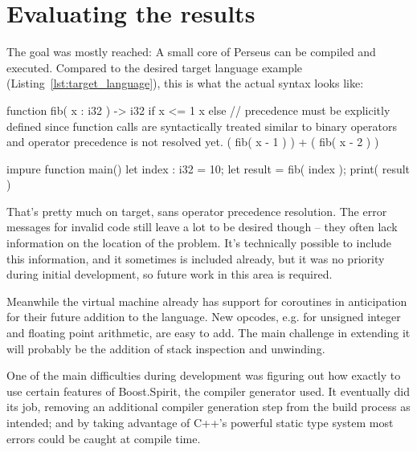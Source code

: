 
\chapter{Evaluating the results}

The goal was mostly reached: A small core of Perseus can be compiled and executed. Compared to the desired target language example (Listing~\ref{lst:target_language}), this is what the actual syntax looks like:

\begin{perseuslisting}[caption={Actual resulting language example},label={lst:result_language}]
function fib( x : i32 ) -> i32
    if x <= 1
        x
    else
    	// precedence must be explicitly defined since function calls are syntactically treated similar to binary operators and operator precedence is not resolved yet.
        ( fib( x - 1 ) ) + ( fib( x - 2 ) )

impure function main()
{
	let index : i32 = 10;
	let result = fib( index );
	print( result )
}
\end{perseuslisting}

That's pretty much on target, sans operator precedence resolution. The error messages for invalid code still leave a lot to be desired though -- they often lack information on the location of the problem. It's technically possible to include this information, and it sometimes is included already, but it was no priority during initial development, so future work in this area is required.

Meanwhile the virtual machine already has support for coroutines in anticipation for their future addition to the language. New opcodes, e.g. for unsigned integer and floating point arithmetic, are easy to add. The main challenge in extending it will probably be the addition of stack inspection and unwinding.

One of the main difficulties during development was figuring out how exactly to use certain features of Boost.Spirit, the compiler generator used. It eventually did its job, removing an additional compiler generation step from the build process as intended; and by taking advantage of C++'s powerful static type system most errors could be caught at compile time.

